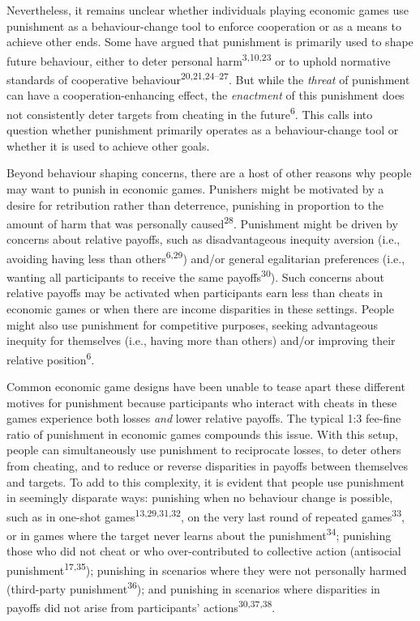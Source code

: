 \documentclass[
  man,floatsintext]{apa6}
\begin{document}
Nevertheless, it remains unclear whether individuals playing economic games use
punishment as a behaviour-change tool to enforce cooperation or as a means to
achieve other ends. Some have argued that punishment is primarily used to shape
future behaviour, either to deter personal harm\textsuperscript{3,10,23} or to uphold normative standards of cooperative behaviour\textsuperscript{20,21,24--27}.
But while the \emph{threat} of punishment can have a cooperation-enhancing effect,
the \emph{enactment} of this punishment does not consistently deter targets from
cheating in the future\textsuperscript{6}. This calls into question whether
punishment primarily operates as a behaviour-change tool or whether it is used
to achieve other goals.

Beyond behaviour shaping concerns, there are a host of other reasons why people
may want to punish in economic games. Punishers might be motivated by a desire
for retribution rather than deterrence, punishing in proportion to the amount
of harm that was personally caused\textsuperscript{28}. Punishment might be driven
by concerns about relative payoffs, such as disadvantageous inequity aversion
(i.e., avoiding having less than others\textsuperscript{6,29}) and/or
general egalitarian preferences (i.e., wanting all participants to receive the
same payoffs\textsuperscript{30}). Such concerns about relative payoffs may be activated
when participants earn less than cheats in economic games or when there are
income disparities in these settings. People might also use punishment for
competitive purposes, seeking advantageous inequity for themselves (i.e., having
more than others) and/or improving their relative position\textsuperscript{6}.

Common economic game designs have been unable to tease apart these different
motives for punishment because participants who interact with cheats in these
games experience both losses \emph{and} lower relative payoffs. The typical 1:3
fee-fine ratio of punishment in economic games compounds this issue. With
this setup, people can simultaneously use punishment to reciprocate losses, to
deter others from cheating, and to reduce or reverse disparities in payoffs
between themselves and targets. To add to this complexity, it is evident that
people use punishment in seemingly disparate ways: punishing when no behaviour
change is possible, such as in one-shot games\textsuperscript{13,29,31,32}, on the very last round of repeated games\textsuperscript{33}, or in games where the target never learns about the
punishment\textsuperscript{34}; punishing those who did not cheat or who
over-contributed to collective action (antisocial punishment\textsuperscript{17,35}); punishing in scenarios where they were not
personally harmed (third-party punishment\textsuperscript{36}); and punishing in
scenarios where disparities in payoffs did not arise from participants'
actions\textsuperscript{30,37,38}.
\end{document}
